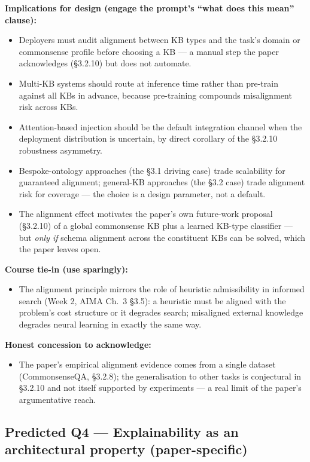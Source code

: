 \documentclass[11pt, a4paper]{article}
\begin{document}
\textbf{Implications for design (engage the prompt's ``what does this mean'' clause):}
\begin{itemize}
  \item Deployers must audit alignment between KB types and the task's domain or commonsense profile before choosing a KB — a manual step the paper acknowledges (§3.2.10) but does not automate.
  \item Multi-KB systems should route at inference time rather than pre-train against all KBs in advance, because pre-training compounds misalignment risk across KBs.
  \item Attention-based injection should be the default integration channel when the deployment distribution is uncertain, by direct corollary of the §3.2.10 robustness asymmetry.
  \item Bespoke-ontology approaches (the §3.1 driving case) trade scalability for guaranteed alignment; general-KB approaches (the §3.2 case) trade alignment risk for coverage — the choice is a design parameter, not a default.
  \item The alignment effect motivates the paper's own future-work proposal (§3.2.10) of a global commonsense KB plus a learned KB-type classifier — but \emph{only if} schema alignment across the constituent KBs can be solved, which the paper leaves open.
\end{itemize}

\textbf{Course tie-in (use sparingly):}
\begin{itemize}
  \item The alignment principle mirrors the role of heuristic admissibility in informed search (Week 2, AIMA Ch.\ 3 §3.5): a heuristic must be aligned with the problem's cost structure or it degrades search; misaligned external knowledge degrades neural learning in exactly the same way.
\end{itemize}

\textbf{Honest concession to acknowledge:}
\begin{itemize}
  \item The paper's empirical alignment evidence comes from a single dataset (CommonsenseQA, §3.2.8); the generalisation to other tasks is conjectural in §3.2.10 and not itself supported by experiments — a real limit of the paper's argumentative reach.
\end{itemize}

\subsection{Predicted Q4 — Explainability as an architectural property (paper-specific)}
\end{document}
